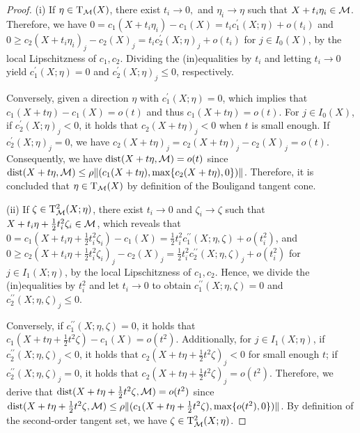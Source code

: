 \begin{proof}
    (i) If $\eta\in\mathrm{T}_{\mathcal{M}}(X)$, there exist $t_i\to 0,$ and $\eta_i\to\eta$ such that $X+t_i\eta_i\in\mathcal{M}$. Therefore, we have $0=c_1(X+t_i\eta_i)-c_1(X)=t_ic_1^\prime(X;\eta)+o(t_i)$ and $0\ge c_2(X+t_i\eta_i)_j-c_2(X)_j=t_ic_2^\prime(X;\eta)_j+o(t_i)$ for $j\in I_0(X)$, by the local Lipschitzness of $c_1,c_2$. Dividing the (in)equalities by $t_i$ and letting $t_i\to 0$ yield $c_1^\prime(X;\eta)=0$ and $c_2^\prime(X;\eta)_j\le 0$, respectively. 
    
    Conversely, given a direction $\eta$ with $c_1^\prime(X;\eta)=0$, which implies that $c_1(X+t\eta)-c_1(X)=o(t)$ and thus $c_1(X+t\eta)=o(t)$. For $j\in I_0(X)$, if $c_2^{\prime}(X;\eta)_j<0$, it holds that $c_2(X+t\eta)_j<0$ when $t$ is small enough. If $c_2^{\prime}(X;\eta)_j=0$, we have $c_2(X+t\eta)_j=c_2(X+t\eta)_j-c_2(X)_j=o(t)$. Consequently, we have $\operatorname{dist}(X+t\eta,\mathcal{M})=o(t)$ since $\operatorname{dist}(X+t\eta,\mathcal{M})\le\rho\|(c_1(X+t\eta),\max\{c_2(X+t\eta),0\})\|$. Therefore, it is concluded that $\eta\in\mathrm{T}_{\mathcal{M}}(X)$ by definition of the Bouligand tangent cone.

    (ii) If $\zeta\in\mathrm{T}^2_{\mathcal{M}}(X;\eta)$, there exist $t_i\to 0$ and $\zeta_i\to\zeta$ such that $X+t_i\eta+\frac{1}{2}t_i^2\zeta_i\in\mathcal{M}$, which reveals that $0=c_1(X+t_i\eta+\frac{1}{2}t_i^2\zeta_i)-c_1(X)=\frac{1}{2}t_i^2c_1^{\prime\prime}(X;\eta,\zeta)+o(t_i^2)$, and $0\ge c_2(X+t_i\eta+\frac{1}{2}t_i^2\zeta_i)_j-c_2(X)_j=\frac{1}{2}t_i^2c_2^{\prime\prime}(X;\eta,\zeta)_j+o(t_i^2)$ for $j\in I_1(X;\eta)$, by the local Lipschitzness of $c_1,c_2$. Hence, we divide the (in)equalities by $t_i^2$ and let $t_i\to 0$ to obtain $c_1^{\prime\prime}(X;\eta,\zeta)=0$ and $c_2^{\prime\prime}(X;\eta,\zeta)_j\le 0$.

    
    
    Conversely, if $c_1^{\prime\prime}(X;\eta,\zeta)=0$, it holds that $c_1(X+t\eta+\frac{1}{2}t^2\zeta)-c_1(X)=o(t^2)$. Additionally, for $j\in I_1(X;\eta)$, if $c_2^{\prime\prime}(X;\eta,\zeta)_j<0$, it holds that $c_2(X+t\eta+\frac{1}{2}t^2\zeta)_j<0$ for small enough $t$; if $c_2^{\prime\prime}(X;\eta,\zeta)_j=0$, it holds that $c_2(X+t\eta+\frac{1}{2}t^2\zeta)_j=o(t^2)$. Therefore, we derive that $\operatorname{dist}(X+t\eta+\frac{1}{2}t^2\zeta,\mathcal{M})=o(t^2)$ since $\operatorname{dist}(X+t\eta+\frac{1}{2}t^2\zeta,\mathcal{M})\le\rho\|(c_1(X+t\eta+\frac{1}{2}t^2\zeta),\max\{o(t^2),0\})\|$. By definition of the second-order tangent set, we have $\zeta\in\mathrm{T}^2_{\mathcal{M}}(X;\eta)$.
\end{proof}

